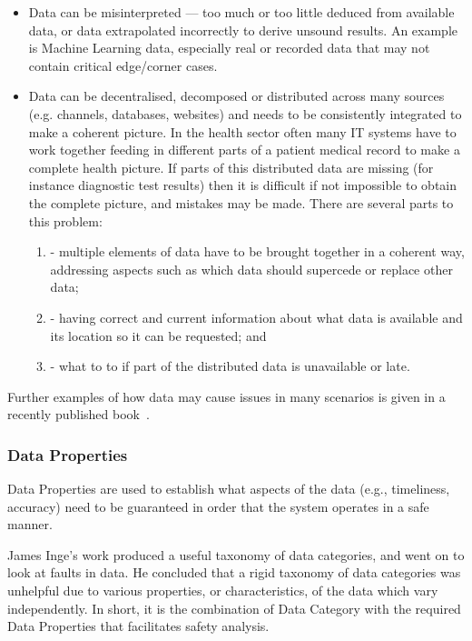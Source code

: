 \begin{itemize}
  \item {} Data can be misinterpreted --- too much or too little deduced from available data, or data extrapolated incorrectly to derive unsound results.
    An example is Machine Learning data, especially real or recorded data that may not contain critical edge/corner cases.

  \item {}
    Data can be decentralised, decomposed or distributed across many sources (e.g. channels, databases, websites) and needs to be consistently integrated to make a coherent picture. In the health sector often many IT systems have to work together feeding in different parts of a patient medical record to make a complete health picture. If parts of this distributed data are missing (for instance diagnostic test results) then it is difficult if not impossible to obtain the complete picture, and mistakes may be made.
    There are several parts to this problem:
    \begin{enumerate}[label=\alph*]
    	\item {} - multiple elements of data have to be brought together in a coherent way, addressing aspects such as which data should supercede or replace other data;
    	\item {} - having correct and current information about what data is available and its location so it can be requested; and
    	\item {} - what to to if part of the distributed data is unavailable or late.
    \end{enumerate}
\end{itemize}


Further examples of how data may cause issues in many scenarios is given in a recently published book~\cite{citation:datacentric}.

\subsubsection{Data Properties}\label{bkm:guidance:dataproperties}
Data Properties are used to establish what aspects of the data (e.g., timeliness, accuracy) need to be guaranteed in order that the system operates in a safe manner.

James Inge's work \cite{citation:inge2008improving} produced a useful taxonomy of data categories, and went on to look at faults in data. He concluded that a rigid taxonomy of data categories was unhelpful due to various properties, or characteristics, of the data which vary independently. In short, it is the combination of Data Category with the required Data Properties that facilitates safety analysis.

